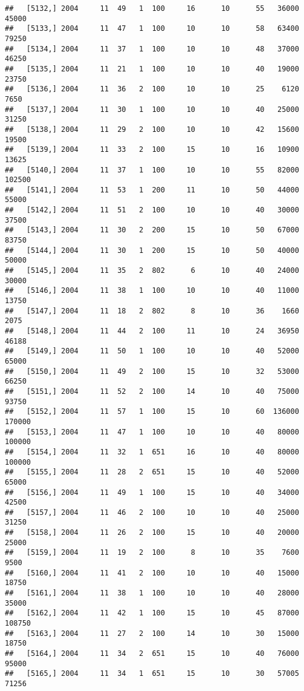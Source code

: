 \documentclass{article}\usepackage[]{graphicx}\usepackage[]{color}
\makeatletter
\newenvironment{kframe}{%
 \def\at@end@of@kframe{}%
 \ifinner\ifhmode%
  \def\at@end@of@kframe{\end{minipage}}%
  \begin{minipage}{\columnwidth}%
 \fi\fi%
 \def\FrameCommand##1{\hskip\@totalleftmargin \hskip-\fboxsep
 \colorbox{shadecolor}{##1}\hskip-\fboxsep
     \hskip-\linewidth \hskip-\@totalleftmargin \hskip\columnwidth}%
 \MakeFramed {\advance\hsize-\width
   \@totalleftmargin\z@ \linewidth\hsize
   \@setminipage}}%
 {\par\unskip\endMakeFramed%
 \at@end@of@kframe}
\newenvironment{knitrout}{}{} %
\makeatother
\begin{document}
\begin{knitrout}
\begin{kframe}
\begin{verbatim}
##   [5132,] 2004     11  49   1  100     16      10      55   36000   45000
##   [5133,] 2004     11  47   1  100     10      10      58   63400   79250
##   [5134,] 2004     11  37   1  100     10      10      48   37000   46250
##   [5135,] 2004     11  21   1  100     10      10      40   19000   23750
##   [5136,] 2004     11  36   2  100     10      10      25    6120    7650
##   [5137,] 2004     11  30   1  100     10      10      40   25000   31250
##   [5138,] 2004     11  29   2  100     10      10      42   15600   19500
##   [5139,] 2004     11  33   2  100     15      10      16   10900   13625
##   [5140,] 2004     11  37   1  100     10      10      55   82000  102500
##   [5141,] 2004     11  53   1  200     11      10      50   44000   55000
##   [5142,] 2004     11  51   2  100     10      10      40   30000   37500
##   [5143,] 2004     11  30   2  200     15      10      50   67000   83750
##   [5144,] 2004     11  30   1  200     15      10      50   40000   50000
##   [5145,] 2004     11  35   2  802      6      10      40   24000   30000
##   [5146,] 2004     11  38   1  100     10      10      40   11000   13750
##   [5147,] 2004     11  18   2  802      8      10      36    1660    2075
##   [5148,] 2004     11  44   2  100     11      10      24   36950   46188
##   [5149,] 2004     11  50   1  100     10      10      40   52000   65000
##   [5150,] 2004     11  49   2  100     15      10      32   53000   66250
##   [5151,] 2004     11  52   2  100     14      10      40   75000   93750
##   [5152,] 2004     11  57   1  100     15      10      60  136000  170000
##   [5153,] 2004     11  47   1  100     10      10      40   80000  100000
##   [5154,] 2004     11  32   1  651     16      10      40   80000  100000
##   [5155,] 2004     11  28   2  651     15      10      40   52000   65000
##   [5156,] 2004     11  49   1  100     15      10      40   34000   42500
##   [5157,] 2004     11  46   2  100     10      10      40   25000   31250
##   [5158,] 2004     11  26   2  100     15      10      40   20000   25000
##   [5159,] 2004     11  19   2  100      8      10      35    7600    9500
##   [5160,] 2004     11  41   2  100     10      10      40   15000   18750
##   [5161,] 2004     11  38   1  100     10      10      40   28000   35000
##   [5162,] 2004     11  42   1  100     15      10      45   87000  108750
##   [5163,] 2004     11  27   2  100     14      10      30   15000   18750
##   [5164,] 2004     11  34   2  651     15      10      40   76000   95000
##   [5165,] 2004     11  34   1  651     15      10      30   57005   71256

\end{verbatim}
\end{kframe}
\end{knitrout}
\end{document}

